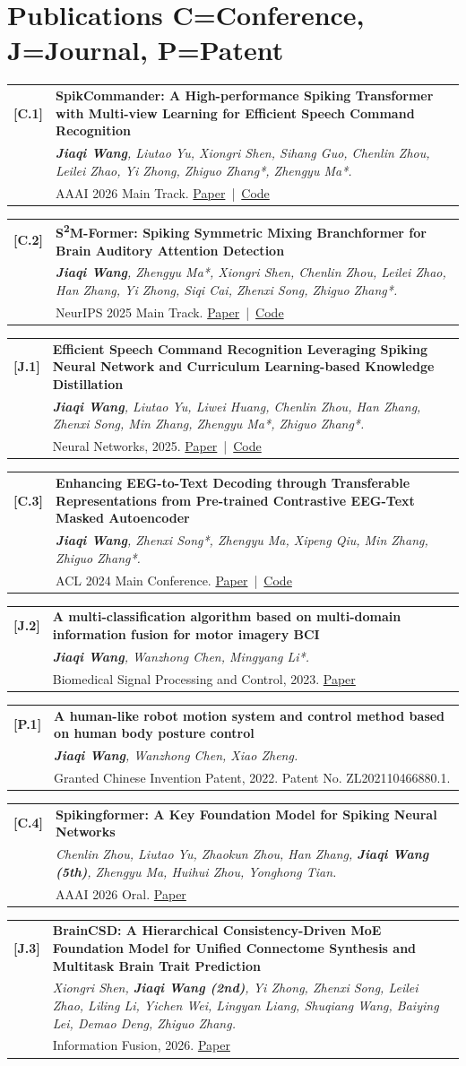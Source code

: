 \documentclass[10pt,a4paper]{article}
\makeatletter
\newcommand{\pub}[4]{
  \begin{tabularx}{\textwidth}{@{}p{0.64in}X@{}}
    \textbf{[#1]} & \textbf{#2} \\
                 & \textit{#3} \\
                 & #4
  \end{tabularx}\vspace{2pt}
}
\makeatother
\begin{document}
\section*{Publications \hfill \normalfont\small C=Conference, J=Journal, P=Patent}
\pub{C.1}{SpikCommander: A High-performance Spiking Transformer with Multi-view Learning for Efficient Speech Command Recognition}{\textbf{Jiaqi Wang}, Liutao Yu, Xiongri Shen, Sihang Guo, Chenlin Zhou, Leilei Zhao, Yi Zhong, Zhiguo Zhang*, Zhengyu Ma*.}{AAAI 2026 Main Track. \href{https://arxiv.org/abs/2511.07883v1}{Paper} \,|\, \href{https://github.com/JackieWang9811/SCommander}{Code}}
\pub{C.2}{S\textsuperscript{2}M-Former: Spiking Symmetric Mixing Branchformer for Brain Auditory Attention Detection}{\textbf{Jiaqi Wang}, Zhengyu Ma*, Xiongri Shen, Chenlin Zhou, Leilei Zhao, Han Zhang, Yi Zhong, Siqi Cai, Zhenxi Song, Zhiguo Zhang*.}{NeurIPS 2025 Main Track. \href{https://arxiv.org/abs/2508.05164}{Paper} \,|\, \href{https://github.com/JackieWang9811/S2M-Former}{Code}}
\pub{J.1}{Efficient Speech Command Recognition Leveraging Spiking Neural Network and Curriculum Learning-based Knowledge Distillation}{\textbf{Jiaqi Wang}, Liutao Yu, Liwei Huang, Chenlin Zhou, Han Zhang, Zhenxi Song, Min Zhang, Zhengyu Ma*, Zhiguo Zhang*.}{Neural Networks, 2025. \href{https://arxiv.org/abs/2412.12858}{Paper} \,|\, \href{https://github.com/JackieWang9811/SpikeSCR}{Code}}
\pub{C.3}{Enhancing EEG-to-Text Decoding through Transferable Representations from Pre-trained Contrastive EEG-Text Masked Autoencoder}{\textbf{Jiaqi Wang}, Zhenxi Song*, Zhengyu Ma, Xipeng Qiu, Min Zhang, Zhiguo Zhang*.}{ACL 2024 Main Conference. \href{https://arxiv.org/abs/2402.17433}{Paper} \,|\, \href{https://github.com/JackieWang9811/CET-MAE}{Code}}
\pub{J.2}{A multi-classification algorithm based on multi-domain information fusion for motor imagery BCI}{\textbf{Jiaqi Wang}, Wanzhong Chen, Mingyang Li*.}{Biomedical Signal Processing and Control, 2023. \href{https://www.sciencedirect.com/science/article/pii/S1746809422007066}{Paper}}
\pub{P.1}{A human-like robot motion system and control method based on human body posture control}{\textbf{Jiaqi Wang}, Wanzhong Chen, Xiao Zheng.}{Granted Chinese Invention Patent, 2022. Patent No. ZL202110466880.1.}
\pub{C.4}{Spikingformer: A Key Foundation Model for Spiking Neural Networks}{Chenlin Zhou, Liutao Yu, Zhaokun Zhou, Han Zhang, \textbf{Jiaqi Wang (5th)}, Zhengyu Ma, Huihui Zhou, Yonghong Tian.}{AAAI 2026 Oral. \href{https://openreview.net/forum?id=SmZTeHYlCa}{Paper}}
\pub{J.3}{BrainCSD: A Hierarchical Consistency-Driven MoE Foundation Model for Unified Connectome Synthesis and Multitask Brain Trait Prediction}{Xiongri Shen, \textbf{Jiaqi Wang (2nd)}, Yi Zhong, Zhenxi Song, Leilei Zhao, Liling Li, Yichen Wei, Lingyan Liang, Shuqiang Wang, Baiying Lei, Demao Deng, Zhiguo Zhang.}{Information Fusion, 2026. \href{https://arxiv.org/abs/2511.05630}{Paper}}
\end{document}
